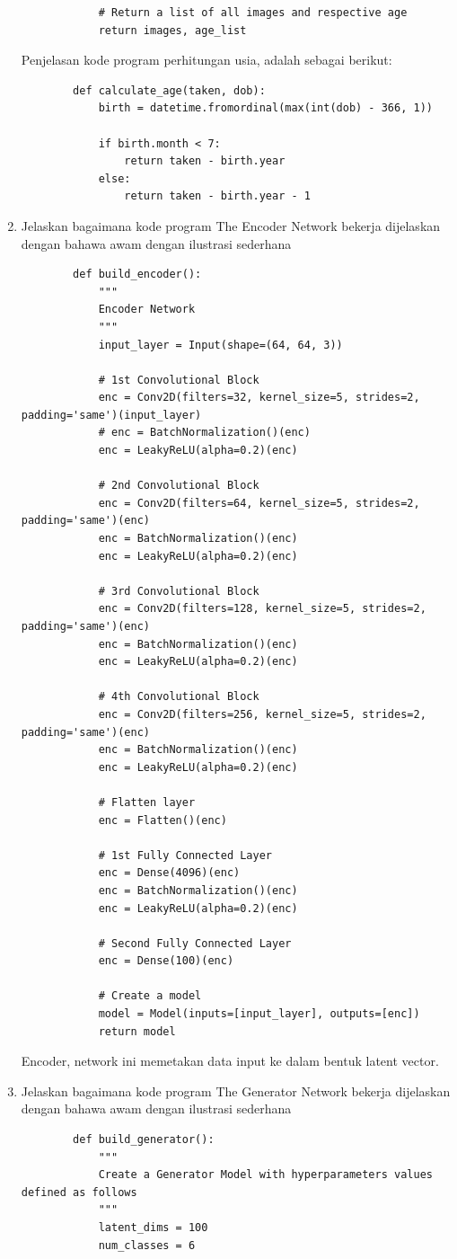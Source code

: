 \begin{enumerate}
\begin{lstlisting}
            # Return a list of all images and respective age
            return images, age_list
    \end{lstlisting}
    Penjelasan kode program perhitungan usia, adalah sebagai berikut:
    \begin{lstlisting}
        def calculate_age(taken, dob):
            birth = datetime.fromordinal(max(int(dob) - 366, 1))

            if birth.month < 7:
                return taken - birth.year
            else:
                return taken - birth.year - 1
    \end{lstlisting}
    \item Jelaskan bagaimana kode program The Encoder Network bekerja dijelaskan dengan bahawa awam dengan ilustrasi sederhana
    \begin{lstlisting}
        def build_encoder():
            """
            Encoder Network
            """
            input_layer = Input(shape=(64, 64, 3))
        
            # 1st Convolutional Block
            enc = Conv2D(filters=32, kernel_size=5, strides=2, padding='same')(input_layer)
            # enc = BatchNormalization()(enc)
            enc = LeakyReLU(alpha=0.2)(enc)
        
            # 2nd Convolutional Block
            enc = Conv2D(filters=64, kernel_size=5, strides=2, padding='same')(enc)
            enc = BatchNormalization()(enc)
            enc = LeakyReLU(alpha=0.2)(enc)
        
            # 3rd Convolutional Block
            enc = Conv2D(filters=128, kernel_size=5, strides=2, padding='same')(enc)
            enc = BatchNormalization()(enc)
            enc = LeakyReLU(alpha=0.2)(enc)
        
            # 4th Convolutional Block
            enc = Conv2D(filters=256, kernel_size=5, strides=2, padding='same')(enc)
            enc = BatchNormalization()(enc)
            enc = LeakyReLU(alpha=0.2)(enc)
        
            # Flatten layer
            enc = Flatten()(enc)
        
            # 1st Fully Connected Layer
            enc = Dense(4096)(enc)
            enc = BatchNormalization()(enc)
            enc = LeakyReLU(alpha=0.2)(enc)
        
            # Second Fully Connected Layer
            enc = Dense(100)(enc)
        
            # Create a model
            model = Model(inputs=[input_layer], outputs=[enc])
            return model
    \end{lstlisting}
    Encoder, network ini memetakan data input ke dalam bentuk latent vector.
    \item Jelaskan bagaimana kode program The Generator Network bekerja dijelaskan dengan bahawa awam dengan ilustrasi sederhana
    \begin{lstlisting}
        def build_generator():
            """
            Create a Generator Model with hyperparameters values defined as follows
            """
            latent_dims = 100
            num_classes = 6


\end{lstlisting}
\end{enumerate}
